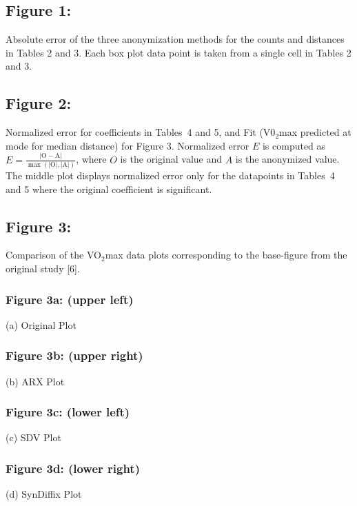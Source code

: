 \documentclass[10pt]{article}
\newcommand{\mycite}[1]{[#1]}
\begin{document}
\subsection*{Figure 1:}

Absolute error of the three anonymization methods for the counts and distances in Tables 2  and 3. Each box plot data point is taken from a single cell in Tables 2 and 3.


\subsection*{Figure 2:}

Normalized error for coefficients in Tables~4 and 5, and Fit (V0$_2$max predicted at mode for median distance) for Figure 3. Normalized error $E$ is computed as $E = \frac{\left| \text{O} - \text{A} \right|}{\max\left( \left| \text{O} \right|, \left| \text{A} \right| \right)}$, where $O$ is the original value and $A$ is the anonymized value. The middle plot displays normalized error only for the datapoints in Tables~4 and 5 where the original coefficient is significant.


\subsection*{Figure 3:}

Comparison of the VO$_2$max data plots corresponding to the base-figure from the original study \mycite{6}.

\subsubsection*{Figure 3a: (upper left)}

(a) Original Plot


\subsubsection*{Figure 3b: (upper right)}

(b) ARX Plot

\subsubsection*{Figure 3c: (lower left)}

(c) SDV Plot

\subsubsection*{Figure 3d: (lower  right)}

(d) SynDiffix Plot
\end{document}
